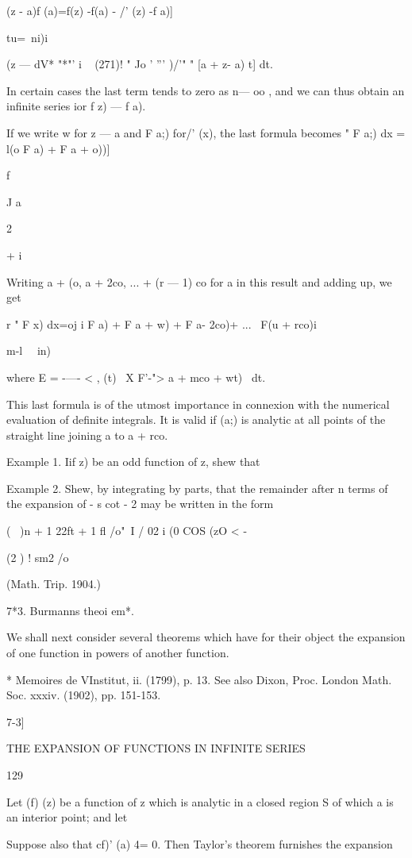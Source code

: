 (z - a)f (a)=f(z) -f(a) - /' (z) -f a)]

tu=\ ni)i

(z — dV* "*"' i ~ (271)! " Jo ' ''' )/'" " [a + z- a) t] dt.

In certain cases the last term tends to zero as n— oo , and we can
thus obtain an infinite series ior f z) — f a).

If we write w for z — a and F a;) for/' (x), the last formula becomes
" F a;) dx = l(o F a) + F a + o))]

f

J a

2

+ i

Writing a + (o, a + 2co, ... + (r — 1) co for a in this result and
adding up, we get

r " F x) dx=oj i F a) + F a + w) + F a- 2co)+ ... \ F(u + rco)i

m-l \ \ in)\

where E = -—- < , (t) \ X F'-"> a + mco + wt) \ dt.

This last formula is of the utmost importance in connexion with the
numerical evaluation of definite integrals. It is valid if (a;) is
analytic at all points of the straight line joining a to a + rco.

Example 1. Iif z) be an odd function of z, shew that

Example 2. Shew, by integrating by parts, that the remainder after n
terms of the expansion of - s cot - 2 may be written in the form

( \ )n + 1 22ft + 1 fl /o"\ I / 02 i (0 COS (zO < -

(2 ) ! sm2 /o

(Math. Trip. 1904.)

7*3. Burmanns theoi em*.

We shall next consider several theorems which have for their object
the expansion of one function in powers of another function.

* Memoires de VInstitut, ii. (1799), p. 13. See also Dixon, Proc.
London Math. Soc. xxxiv. (1902), pp. 151-153.

7-3]

THE EXPANSION OF FUNCTIONS IN INFINITE SERIES

129

Let (f) (z) be a function of z which is analytic in a closed region S
of which a is an interior point; and let

Suppose also that cf)' (a) 4= 0. Then Taylor's theorem furnishes the
expansion

